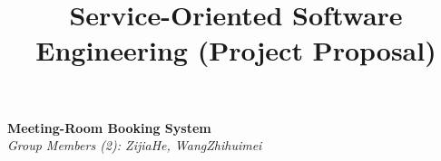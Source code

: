 \documentclass[runningheads]{llncs}
\begin{document}
\title{\large{Service-Oriented Software Engineering (Project Proposal)}}
\author{}
\institute{}
\maketitle
\vspace{-1cm}



\begin{center}
\Large{\textbf{Meeting-Room Booking System}} \\ %
\vspace{0.2cm}
\large{\emph{Group Members (2): ZijiaHe, WangZhihuimei}} \\%
\vspace{0.3cm}  
\end{center}

\noindent
\end{document}
